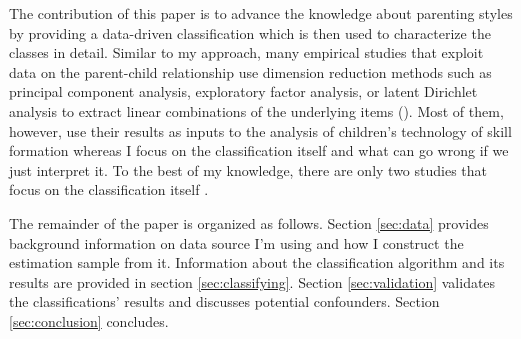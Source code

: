 

The contribution of this paper is to advance the knowledge about parenting styles by providing a data-driven classification which is then used to characterize the classes in detail. Similar to my approach, many empirical studies that exploit data on the parent-child relationship use dimension reduction methods such as principal component analysis, exploratory factor analysis, or latent Dirichlet analysis to extract linear combinations of the underlying items (\cite{ermischOriginsSocialImmobility2008, chanParentingStyleYouth2011, fioriniHowAllocationChildren2014, bonoEarlyMaternalTime2016, cobb-clarkParentingStyleInvestment2019, zumbuehlParentalInvolvementIntergenerational2020, rauhParentingTypes2020}). Most of them, however, use their results as inputs to the analysis of children's technology of skill formation whereas I focus on the classification itself and what can go wrong if we just interpret it. To the best of my knowledge, there are only two studies that focus on the classification itself \parencites{chanParentingStyleYouth2011}{rauhParentingTypes2020}.

The remainder of the paper is organized as follows. Section \ref{sec:data} provides background information on data source I'm using and how I construct the estimation sample from it. Information about the classification algorithm and its results are provided in section \ref{sec:classifying}. Section \ref{sec:validation} validates the classifications' results and discusses potential confounders. Section \ref{sec:conclusion} concludes.


